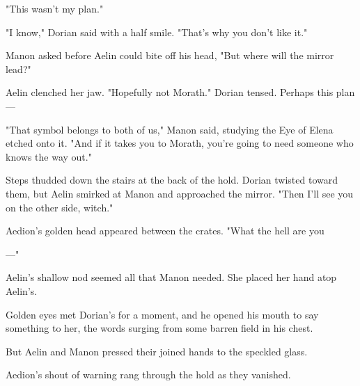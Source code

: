 "This wasn't my plan."

"I know," Dorian said with a half smile. "That's why you don't like it."

Manon asked before Aelin could bite off his head, "But where will the mirror lead?"

Aelin clenched her jaw. "Hopefully not Morath." Dorian tensed. Perhaps this plan---

"That symbol belongs to both of us," Manon said, studying the Eye of Elena etched onto it. "And if it takes you to Morath, you're going to need someone who knows the way out."

Steps thudded down the stairs at the back of the hold. Dorian twisted toward them, but Aelin smirked at Manon and approached the mirror. "Then I'll see you on the other side, witch."

Aedion's golden head appeared between the crates. "What the hell are you

---"

Aelin's shallow nod seemed all that Manon needed. She placed her hand atop Aelin's.

Golden eyes met Dorian's for a moment, and he opened his mouth to say something to her, the words surging from some barren field in his chest.

But Aelin and Manon pressed their joined hands to the speckled glass.

Aedion's shout of warning rang through the hold as they vanished.
